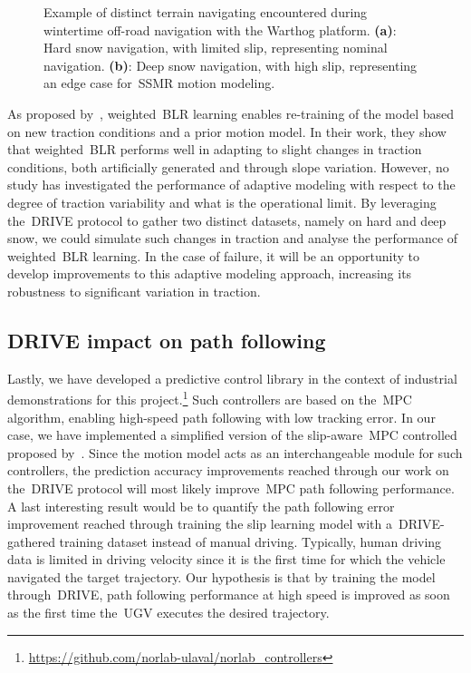 \documentclass[12pt,letterpaper,oneside]{article}
\begin{document}
\begin{figure}[h!]
\begin{center}
\begin{subfigure}[b]{0.49\textwidth}
			\caption{}
			\label{fig:deep_snow}
		\end{subfigure}%
		\caption{
			Example of distinct terrain navigating encountered during wintertime off-road navigation with the Warthog platform.
			\textbf{(a)}: Hard snow navigation, with limited slip, representing nominal navigation.
			\textbf{(b)}: Deep snow navigation, with high slip, representing an edge case for~\ac{SSMR} motion modeling.
		}
		\label{fig:snow_var}
	\end{center}
\end{figure}

As proposed by~\citet{Mckinnon2019}, weighted~\ac{BLR} learning enables re-training of the model based on new traction conditions and a prior motion model.
In their work, they show that weighted~\ac{BLR} performs well in adapting to slight changes in traction conditions, both artificially generated and through slope variation.
However, no study has investigated the performance of adaptive modeling with respect to the degree of traction variability and what is the operational limit.
By leveraging the~\ac{DRIVE} protocol to gather two distinct datasets, namely on hard and deep snow, we could simulate such changes in traction and analyse the performance of weighted~\ac{BLR} learning.
In the case of failure, it will be an opportunity to develop improvements to this adaptive modeling approach, increasing its robustness to significant variation in traction.

\subsection{\ac{DRIVE} impact on path following}
Lastly, we have developed a predictive control library in the context of industrial demonstrations for this project.\footnote{\url{https://github.com/norlab-ulaval/norlab_controllers}}
Such controllers are based on the~\ac{MPC} algorithm, enabling high-speed path following with low tracking error.
In our case, we have implemented a simplified version of the slip-aware~\ac{MPC} controlled proposed by~\citet{Hewing2020}.
Since the motion model acts as an interchangeable module for such controllers, the prediction accuracy improvements reached through our work on the~\ac{DRIVE} protocol will most likely improve~\ac{MPC} path following performance.
A last interesting result would be to quantify the path following error improvement reached through training the slip learning model with a~\ac{DRIVE}-gathered training dataset instead of manual driving.
Typically, human driving data is limited in driving velocity since it is the first time for which the vehicle navigated the target trajectory.
Our hypothesis is that by training the model through~\ac{DRIVE}, path following performance at high speed is improved as soon as the first time the~\ac{UGV} executes the desired trajectory.
\end{document}

